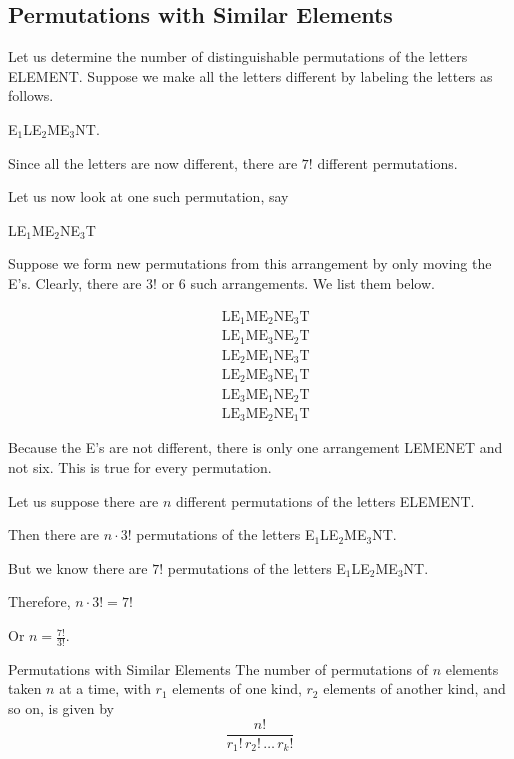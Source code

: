 \subsection{Permutations with Similar Elements}

Let us determine the number of distinguishable permutations of the letters ELEMENT. Suppose we make all the letters different by labeling the letters as follows.

E$_1$LE$_2$ME$_3$NT.

Since all the letters are now different, there are $7!$ different permutations.

Let us now look at one such permutation, say

LE$_1$ME$_2$NE$_3$T

Suppose we form new permutations from this arrangement by only moving the E's. Clearly, there are $3!$ or 6 such arrangements. We list them below.

\begin{align*}
     & \text{LE$_1$ME$_2$NE$_3$T} \\
     & \text{LE$_1$ME$_3$NE$_2$T} \\
     & \text{LE$_2$ME$_1$NE$_3$T} \\
     & \text{LE$_2$ME$_3$NE$_1$T} \\
     & \text{LE$_3$ME$_1$NE$_2$T} \\
     & \text{LE$_3$ME$_2$NE$_1$T}
\end{align*}

Because the E's are not different, there is only one arrangement LEMENET and not six. This is true for every permutation.

Let us suppose there are \( n \) different permutations of the letters ELEMENT.

Then there are \( n \cdot 3! \) permutations of the letters E$_1$LE$_2$ME$_3$NT.

But we know there are \( 7! \) permutations of the letters E$_1$LE$_2$ME$_3$NT.

Therefore, \( n \cdot 3! = 7! \)

Or \( n = \frac{7!}{3!} \).


\begin{summarybox}{Permutations with Similar Elements}
    The number of permutations of \( n \) elements taken \( n \) at a time, with \( r_1 \) elements of one kind, \( r_2 \) elements of another kind, and so on, is given by
    \[
        \frac{n!}{r_1! \, r_2! \, \dots \, r_k!}
    \]
\end{summarybox}


